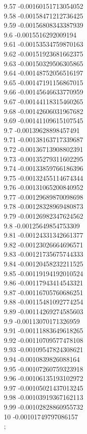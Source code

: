 {9.57	-0.00160151713054052\\
9.58	-0.00158471212736425\\
9.59	-0.00156808343387939\\
9.6	-0.0015516292009194\\
9.61	-0.00153534759870163\\
9.62	-0.00151923681662375\\
9.63	-0.00150329506305865\\
9.64	-0.00148752056516197\\
9.65	-0.00147191156867015\\
9.66	-0.00145646633770959\\
9.67	-0.00144118315460265\\
9.68	-0.00142606031967682\\
9.69	-0.00141109615107545\\
9.7	-0.00139628898457491\\
9.71	-0.00138163717339687\\
9.72	-0.00136713908802391\\
9.73	-0.00135279311602295\\
9.74	-0.00133859766186396\\
9.75	-0.00132455114674344\\
9.76	-0.00131065200840952\\
9.77	-0.00129689870098698\\
9.78	-0.00128328969480873\\
9.79	-0.00126982347624562\\
9.8	-0.00125649854753309\\
9.81	-0.00124331342661377\\
9.82	-0.00123026664696571\\
9.83	-0.00121735675744333\\
9.84	-0.00120458232211525\\
9.85	-0.00119194192010524\\
9.86	-0.00117943414543321\\
9.87	-0.00116705760686251\\
9.88	-0.00115481092774254\\
9.89	-0.00114269274585603\\
9.9	-0.00113070171326959\\
9.91	-0.00111883649618265\\
9.92	-0.00110709577478108\\
9.93	-0.00109547824308621\\
9.94	-0.0010839826088164\\
9.95	-0.00107260759323918\\
9.96	-0.00106135193102972\\
9.97	-0.00105021437013245\\
9.98	-0.00103919367162113\\
9.99	-0.00102828860955732\\
10	-0.00101749797086157\\
};
